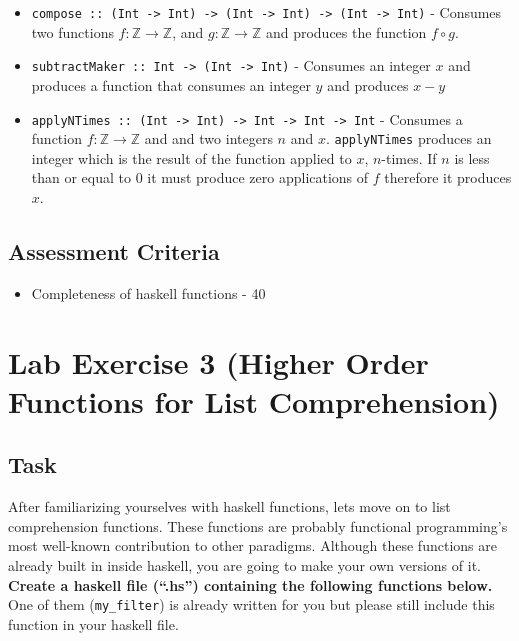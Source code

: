 \begin{itemize}
\tightlist
\item
  \texttt{compose\ ::\ (Int\ -\textgreater{}\ Int)\ -\textgreater{}\ (Int\ -\textgreater{}\ Int)\ -\textgreater{}\ (Int\ -\textgreater{}\ Int)}
  - Consumes two functions \(f : \mathbb{Z} \to \mathbb{Z}\), and
  \(g:  \mathbb{Z} \to \mathbb{Z}\) and produces the function
  \(f \circ g\).
\item
  \texttt{subtractMaker\ ::\ Int\ -\textgreater{}\ (Int\ -\textgreater{}\ Int)}
  - Consumes an integer \(x\) and produces a function that consumes an
  integer \(y\) and produces \(x-y\)
\item
  \texttt{applyNTimes\ ::\ (Int\ -\textgreater{}\ Int)\ -\textgreater{}\ Int\ -\textgreater{}\ Int\ -\textgreater{}\ Int}
  - Consumes a function \(f: \mathbb{Z} \to \mathbb{Z}\) and and two
  integers \(n\) and \(x\). \texttt{applyNTimes} produces an integer
  which is the result of the function applied to \(x\), \(n\)-times. If
  \(n\) is less than or equal to 0 it must produce zero applications of
  \(f\) therefore it produces \(x\).
\end{itemize}

\section{Assessment
Criteria}\label{lab-exercise-2-exploring-haskell.md__assessment-criteria}

\begin{itemize}
\tightlist
\item
  Completeness of haskell functions - 40
\end{itemize}

\chapter{Lab Exercise 3 (Higher Order Functions for List
Comprehension)}\label{lab-exercise-3-higher-order-functions.md__lab-exercise-3-higher-order-functions-for-list-comprehension}

\section{Task}\label{lab-exercise-3-higher-order-functions.md__task}

After familiarizing yourselves with haskell functions, lets move on to
list comprehension functions. These functions are probably functional
programming's most well-known contribution to other paradigms. Although
these functions are already built in inside haskell, you are going to
make your own versions of it. \textbf{Create a haskell file (``.hs'')
containing the following functions below.} One of them
(\texttt{my\_filter}) is already written for you but please still
include this function in your haskell file.


